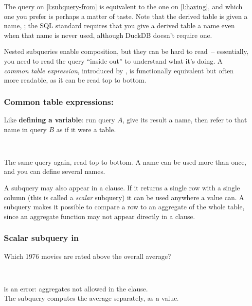 The query on \autoref{l:subquery-from} is equivalent to the one on \autoref{l:having}, and which one you prefer is perhaps a matter of taste.
Note that the derived table is given a name, ; the SQL standard requires that you give a derived table a name even when that name is never used, although DuckDB doesn't require one.

Nested subqueries enable composition, but they can be hard to read~-- essentially, you need to read the query ``inside out'' to understand what it's doing.
A \emph{common table expression}, introduced by , is functionally equivalent but often more readable, as it can be read top to bottom.

\begin{frame}
    \label{s:cte}
    \frametitle{Common table expressions: }
    Like \textbf{defining a variable}: run query $A$, give its result a name, then refer to that name in query $B$ as if it were a table.
    \inputminted[fontsize=\footnotesize]{sql}{code/sql-cte.sql}
    \vspace{0.3em}
    {\footnotesize}\\[0.8em]
    The same query again, read top to bottom.
    A name can be used more than once, and you can define several names.
\end{frame}
\label{l:cte}

A subquery may also appear in a  clause.
If it returns a single row with a single column (this is called a \emph{scalar} subquery) it can be used anywhere a value can.
A subquery makes it possible to compare a row to an aggregate of the whole table, since an aggregate function may not appear directly in a  clause.

\begin{frame}
    \label{s:subquery-where}
    \frametitle{Scalar subquery in }
    Which 1976 movies are rated above the overall average?
    \inputminted[fontsize=\footnotesize]{sql}{code/sql-subquery-where.sql}
    \vspace{0.3em}
    {\footnotesize}\\[0.8em]
     is an error: aggregates not allowed in the  clause.\\[0.8em]
    The subquery computes the average separately, as a value.
\end{frame}
\label{l:subquery-where}

